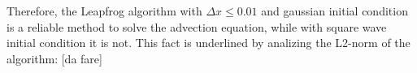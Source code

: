 \documentclass[11pt,a4paper]{article}
\begin{document}
\begin{figure}[!h]
\centering
{}
\end{figure}
Therefore, the Leapfrog algorithm with $\Delta x \leq 0.01$ and gaussian initial condition is a reliable method to solve the advection equation, while with square wave initial condition it is not. This fact is underlined by analizing the L2-norm of the algorithm: [da fare]
\end{document}
